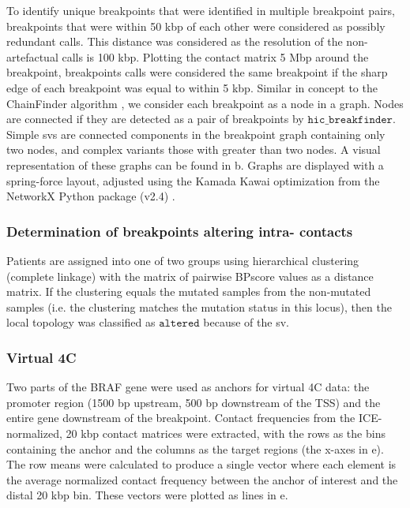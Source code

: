 To identify unique breakpoints that were identified in multiple breakpoint pairs, breakpoints that were within 50 kbp of each other were considered as possibly redundant calls.
This distance was considered as the resolution of the non-artefactual calls is 100 kbp.
Plotting the contact matrix 5 Mbp around the breakpoint, breakpoints calls were considered the same breakpoint if the sharp edge of each breakpoint was equal to within 5 kbp.
Similar in concept to the ChainFinder algorithm \cite{bacaPunctuatedEvolutionProstate2013}, we consider each breakpoint as a node in a graph.
Nodes are connected if they are detected as a pair of breakpoints by $\texttt{hic\_breakfinder}$.
Simple \glspl{sv} are connected components in the breakpoint graph containing only two nodes, and complex variants those with greater than two nodes.
A visual representation of these graphs can be found in b.
Graphs are displayed with a spring-force layout, adjusted using the Kamada Kawai optimization \cite{kamadaAlgorithmDrawingGeneral1989} from the NetworkX Python package (v2.4) \cite{hagbergExploringNetworkStructure2008}.

\subsubsection{Determination of  breakpoints altering intra- contacts}

Patients are assigned into one of two groups using hierarchical clustering (complete linkage) with the matrix of pairwise BPscore \cite{zaborowskiBPscoreEffectiveMetric2019} values as a distance matrix.
If the clustering equals the mutated samples from the non-mutated samples (i.e. the clustering matches the mutation status in this locus), then the local topology was classified as $\texttt{altered}$ because of the \gls{sv}.

\subsubsection{Virtual 4C}

Two parts of the BRAF gene were used as anchors for virtual 4C data: the promoter region (1500 bp upstream, 500 bp downstream of the TSS) and the entire gene downstream of the breakpoint.
Contact frequencies from the ICE-normalized, 20 kbp contact matrices were extracted, with the rows as the bins containing the anchor and the columns as the target regions (the x-axes in e).
The row means were calculated to produce a single vector where each element is the average normalized contact frequency between the anchor of interest and the distal 20 kbp bin.
These vectors were plotted as lines in e.

